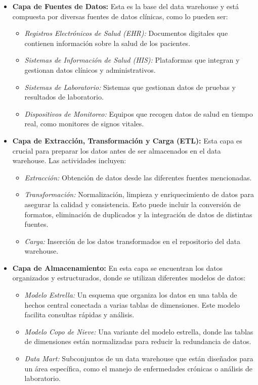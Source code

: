 \documentclass[12pt, a4paper, twoside]{article}
\begin{document}
	
	\begin{itemize}
		\item \textbf{Capa de Fuentes de Datos:} Esta es la base del data warehouse y está compuesta por diversas fuentes de datos clínicas, como lo pueden ser:
		\begin{itemize}
			\item \textit{Registros Electrónicos de Salud (EHR):} Documentos digitales que contienen información sobre la salud de los pacientes.
			\item \textit{Sistemas de Información de Salud (HIS):} Plataformas que integran y gestionan datos clínicos y administrativos.
			\item \textit{Sistemas de Laboratorio:} Sistemas que gestionan datos de pruebas y resultados de laboratorio.
			\item \textit{Dispositivos de Monitoreo:} Equipos que recogen datos de salud en tiempo real, como monitores de signos vitales.
		\end{itemize}
		
		\item \textbf{Capa de Extracción, Transformación y Carga (ETL):} Esta capa es crucial para preparar los datos antes de ser almacenados en el data warehouse. Las actividades incluyen:
		\begin{itemize}
			\item \textit{Extracción:} Obtención de datos desde las diferentes fuentes mencionadas.
			\item \textit{Transformación:} Normalización, limpieza y enriquecimiento de datos para asegurar la calidad y consistencia. Esto puede incluir la conversión de formatos, eliminación de duplicados y la integración de datos de distintas fuentes.
			\item \textit{Carga:} Inserción de los datos transformados en el repositorio del data warehouse.
		\end{itemize}
		
		\item \textbf{Capa de Almacenamiento:} En esta capa se encuentran los datos organizados y estructurados, donde se utilizan diferentes modelos de datos:
		\begin{itemize}
			\item \textit{Modelo Estrella:} Un esquema que organiza los datos en una tabla de hechos central conectada a varias tablas de dimensiones. Este modelo facilita consultas rápidas y análisis.
			\item \textit{Modelo Copo de Nieve:} Una variante del modelo estrella, donde las tablas de dimensiones están normalizadas para reducir la redundancia de datos.
			\item \textit{Data Mart:} Subconjuntos de un data warehouse que están diseñados para un área específica, como el manejo de enfermedades crónicas o análisis de laboratorio.
		\end{itemize}
		

\end{itemize}
\end{document}
